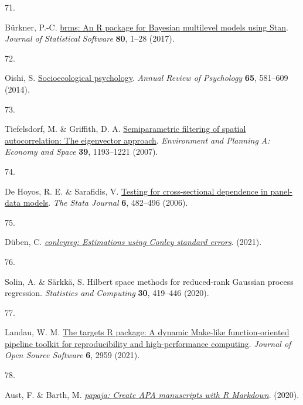 \documentclass[
  man,floatsintext]{apa6}
\newlength{\cslhangindent}
\newlength{\csllabelwidth}
\newlength{\cslentryspacingunit} %
\newenvironment{CSLReferences}[2] %
 {%
  \setlength{\parindent}{0pt}
  \ifodd #1
  \let\oldpar\par
  \def\par{\hangindent=\cslhangindent\oldpar}
  \fi
  \setlength{\parskip}{#2\cslentryspacingunit}
 }%
 {}
\newcommand{\CSLLeftMargin}[1]{\parbox[t]{\csllabelwidth}{#1}}
\newcommand{\CSLRightInline}[1]{\parbox[t]{\linewidth - \csllabelwidth}{#1}\break}
\begin{document}
\begin{CSLReferences}{0}{0}
\leavevmode{}%
\CSLLeftMargin{71. }%
\CSLRightInline{Bürkner, P.-C. \href{https://doi.org/10.18637/jss.v080.i01}{{brms}: An {R} package for {Bayesian} multilevel models using {Stan}}. \emph{Journal of Statistical Software} \textbf{80}, 1--28 (2017).}

\leavevmode{}%
\CSLLeftMargin{72. }%
\CSLRightInline{Oishi, S. \href{https://doi.org/10.1146/annurev-psych-030413-152156}{Socioecological psychology}. \emph{Annual Review of Psychology} \textbf{65}, 581--609 (2014).}

\leavevmode{}%
\CSLLeftMargin{73. }%
\CSLRightInline{Tiefelsdorf, M. \& Griffith, D. A. \href{https://doi.org/10.1068/a37378}{Semiparametric filtering of spatial autocorrelation: The eigenvector approach}. \emph{Environment and Planning A: Economy and Space} \textbf{39}, 1193--1221 (2007).}

\leavevmode{}%
\CSLLeftMargin{74. }%
\CSLRightInline{De Hoyos, R. E. \& Sarafidis, V. \href{https://doi.org/10.1177/1536867X0600600403}{Testing for cross-sectional dependence in panel-data models}. \emph{The Stata Journal} \textbf{6}, 482--496 (2006).}

\leavevmode{}%
\CSLLeftMargin{75. }%
\CSLRightInline{Düben, C. \emph{\href{https://CRAN.R-project.org/package=conleyreg}{{conleyreg}: Estimations using {C}onley standard errors}}. (2021).}

\leavevmode{}%
\CSLLeftMargin{76. }%
\CSLRightInline{Solin, A. \& Särkkä, S. Hilbert space methods for reduced-rank {G}aussian process regression. \emph{Statistics and Computing} \textbf{30}, 419--446 (2020).}

\leavevmode{}%
\CSLLeftMargin{77. }%
\CSLRightInline{Landau, W. M. \href{https://doi.org/10.21105/joss.02959}{The targets {R} package: A dynamic {M}ake-like function-oriented pipeline toolkit for reproducibility and high-performance computing}. \emph{Journal of Open Source Software} \textbf{6}, 2959 (2021).}

\leavevmode{}%
\CSLLeftMargin{78. }%
\CSLRightInline{Aust, F. \& Barth, M. \emph{\href{https://github.com/crsh/papaja}{{papaja}: {Create} {APA} manuscripts with {R Markdown}}}. (2020).}

\end{CSLReferences}
\end{document}
